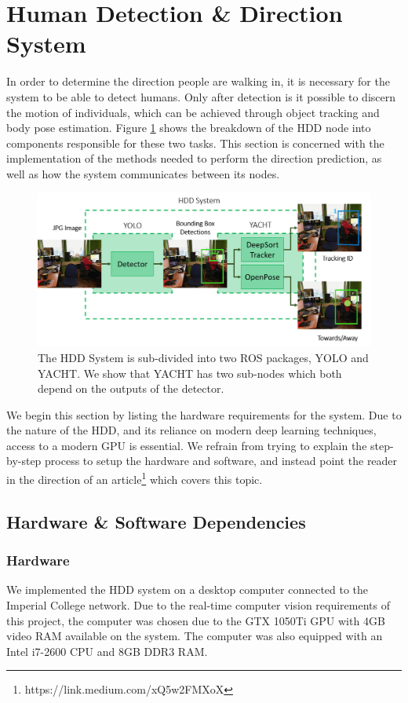 \section{Human Detection \& Direction System}
In order to determine the direction people are walking in, it is necessary for the system to be able to detect humans. Only after detection is it possible to discern the motion of individuals, which can be achieved through object tracking and body pose estimation. Figure \ref{fig:detailedHDD} shows the breakdown of the HDD node into components responsible for these two tasks. This section is concerned with the implementation of the methods needed to perform the direction prediction, as well as how the system communicates between its nodes. 

\begin{figure}[ht]
	\centering
	\includegraphics[width=1.0\linewidth]{img/chapter5_implementation/hddSystemDiagram.png}
	\caption{The HDD System is sub-divided into two ROS packages, YOLO and YACHT. We show that YACHT has two sub-nodes which both depend on the outputs of the detector.}
	\label{fig:detailedHDD}
\end{figure}

We begin this section by listing the hardware requirements for the system. Due to the nature of the HDD, and its reliance on modern deep learning techniques, access to a modern GPU is essential. We refrain from trying to explain the step-by-step process to setup the hardware and software, and instead point the reader in the direction of an article\footnote{https://link.medium.com/xQ5w2FMXoX} which covers this topic.

\subsection{Hardware \& Software Dependencies}

\subsubsection{Hardware}
We implemented the HDD system on a desktop computer connected to the Imperial College network. Due to the real-time computer vision requirements of this project, the computer was chosen due to the GTX 1050Ti GPU with 4GB video RAM available on the system. The computer was also equipped with an Intel i7-2600 CPU and 8GB DDR3 RAM.

